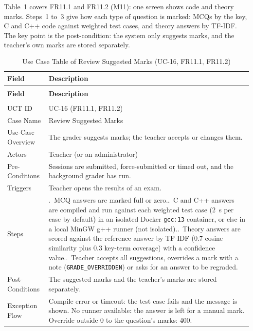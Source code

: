 Table~\ref{tab:uct_compilation_evaluation} covers FR11.1 and FR11.2 (M11): one screen shows code and theory marks. Steps~1 to~3 give how each type of question is marked: MCQs by the key, C and C++ code against weighted test cases, and theory answers by TF-IDF. The key point is the post-condition: the system only suggests marks, and the teacher's own marks are stored separately.

{\renewcommand{\arraystretch}{1.1}\setlength{\tabcolsep}{6pt}
\begin{longtable}{>{\small\raggedright\arraybackslash}p{3.3cm}>{\small\raggedright\arraybackslash}p{\dimexpr\textwidth-3.3cm-4\tabcolsep\relax}}
\caption{Use Case Table of Review Suggested Marks (UC-16, FR11.1, FR11.2)}\label{tab:uct_compilation_evaluation}\\ \hline\hline
\textbf{Field} & \textbf{Description} \\ \hline\hline
\endfirsthead
\multicolumn{2}{c}{\small\tablename~\thetable{} -- continued from previous page}\\ \hline\hline
\textbf{Field} & \textbf{Description} \\ \hline\hline
\endhead
\hline \multicolumn{2}{r}{\small Continued on next page}\\
\endfoot
\hline\hline
\endlastfoot
UCT ID & UC-16 (FR11.1, FR11.2) \\*
Case Name & Review Suggested Marks \\*
Use-Case Overview & The grader suggests marks; the teacher accepts or changes them. \\*
Actors & Teacher (or an administrator) \\*
Pre-Conditions & Sessions are submitted, force-submitted or timed out, and the background grader has run. \\*
Triggers & Teacher opens the results of an exam. \\
Steps & 1.~MCQ answers are marked full or zero.\newline
2.~C and C++ answers are compiled and run against each weighted test case (2~s per case by default) in an isolated Docker \texttt{gcc:13} container, or else in a local MinGW g++ runner (not isolated).\newline
3.~Theory answers are scored against the reference answer by TF-IDF \cite{salton1988} (0.7 cosine similarity plus 0.3 key-term coverage) with a confidence value.\newline
4.~Teacher accepts all suggestions, overrides a mark with a note (\texttt{GRADE\_OVERRIDDEN}) or asks for an answer to be regraded. \\
Post-Conditions & The suggested marks and the teacher's marks are stored separately. \\
Exception Flow & Compile error or timeout: the test case fails and the message is shown. No runner available: the answer is left for a manual mark. Override outside 0 to the question's marks: 400. \\
\end{longtable}}

